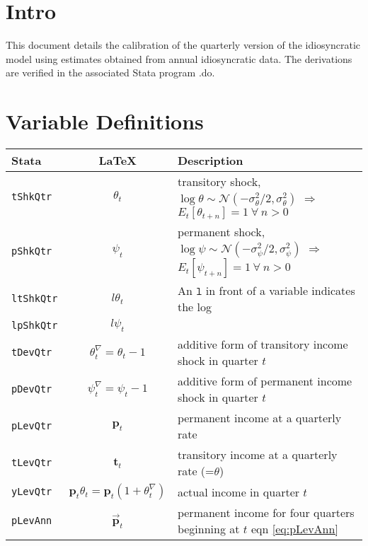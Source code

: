 \documentclass[11pt,letterpaper]{article}
\begin{document}
\tableofcontents 

\section{Intro}
This document details the calibration of the quarterly version of the idiosyncratic
model using estimates obtained from annual idiosyncratic data.  The derivations are
verified in the associated Stata program .do.

\section{Variable Definitions}

\begin{center}
\begin{tabular}{lcl}
Stata              & LaTeX                       & Description
\\ \hline
    \texttt{tShkQtr}  & $\theta_{t}$                     & transitory shock, $\log \theta\sim\mathcal{N}(-\sigma^{2}_{\theta}/2,\sigma^{2}_{\theta})$ $\Rightarrow$ $E_{t}[\theta_{t+n}]=1~\forall~n>0$
\\  \texttt{pShkQtr}  & $\psi_{t}$                     & permanent shock, $\log \psi\sim\mathcal{N}(-\sigma^{2}_{\psi}/2,\sigma^{2}_{\psi})$ $\Rightarrow$ $E_{t}[\psi_{t+n}]=1~\forall~n>0$
\\  \texttt{ltShkQtr}  & $l{\theta}_{t}$              & An $\texttt{l}$ in front of a variable indicates the log
\\  \texttt{lpShkQtr}  & $l{\psi}_{t}$                     & 
\\  \texttt{tDevQtr}  & $\theta^{\nabla}_{t}=\theta_{t}-1$    & additive form of transitory income shock in quarter $t$ %
\\  \texttt{pDevQtr}  & $\psi^{\nabla}_{t}=\psi_{t}-1$    & additive form of permanent income shock in quarter $t$ %
\\  \texttt{pLevQtr}  & $\mathbf{p}_{t}$                 & permanent income at a quarterly rate
\\  \texttt{tLevQtr}  & $\mathbf{t}_{t}$                 & transitory income at a quarterly rate (=$\theta$)
\\  \texttt{yLevQtr}  & $\mathbf{p}_{t}\theta_{t}=\mathbf{p}_{t}(1+\theta^{\nabla}_{t})$   & actual income in quarter $t$
\\  \texttt{pLevAnn}  & $\vec{\mathbf{p}}_{t}$                & permanent income for four quarters beginning at $t$ eqn \eqref{eq:pLevAnn}

\end{tabular}
\end{center}
\end{document}
